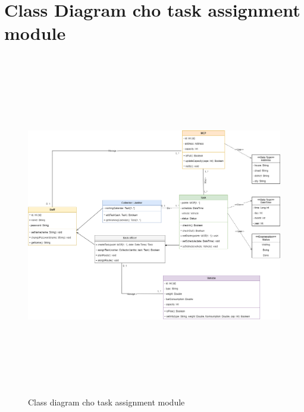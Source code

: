\section{Class Diagram cho task assignment module}
     \begin{figure}[h]
        \centering
        \includegraphics[width=15cm,height=15cm]{imgs/class diagram/class diagram.png}
        \caption{Class diagram cho task assignment module}
    \end{figure}

